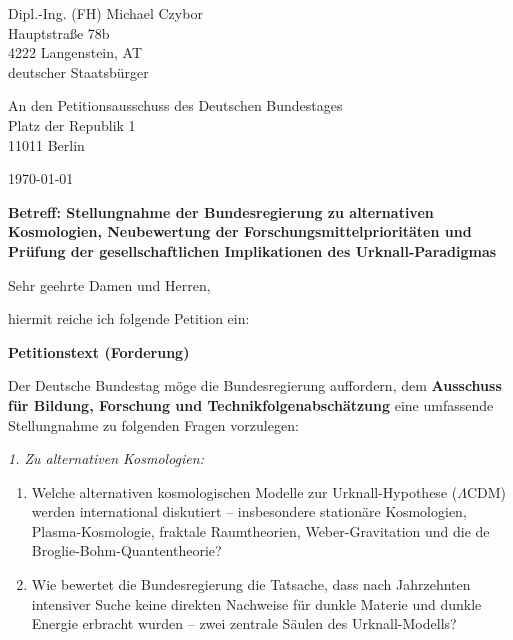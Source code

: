 \documentclass[11pt,a4paper]{letter}
\begin{document}
\begin{letter}

Dipl.-Ing. (FH) Michael Czybor \\ Hauptstraße 78b \\ 4222 Langenstein, AT \\ deutscher Staatsbürger

\vspace{0.5cm}

An den Petitionsausschuss des Deutschen Bundestages \\ Platz der Republik 1 \\ 11011 Berlin

\begin{flushright}
	\today
\end{flushright}

\vspace{0.5cm}

\textbf{Betreff: Stellungnahme der Bundesregierung zu alternativen Kosmologien, Neubewertung der Forschungsmittelprioritäten und Prüfung der gesellschaftlichen Implikationen des Urknall-Paradigmas}

\vspace{0.5cm}

Sehr geehrte Damen und Herren,

hiermit reiche ich folgende Petition ein:

\vspace{0.3cm}

\noindent
\textbf{Petitionstext (Forderung)}

Der Deutsche Bundestag möge die Bundesregierung auffordern, dem \textbf{Ausschuss für Bildung, Forschung und Technikfolgenabschätzung} eine umfassende Stellungnahme zu folgenden Fragen vorzulegen:

\vspace{0.2cm}

\noindent
\textit{1. Zu alternativen Kosmologien:}

\begin{enumerate}
    \item Welche alternativen kosmologischen Modelle zur Urknall-Hypothese ($\Lambda$CDM) werden international diskutiert – insbesondere stationäre Kosmologien, Plasma-Kosmologie, fraktale Raumtheorien, Weber-Gravitation und die de Broglie-Bohm-Quantentheorie?
    
    \item Wie bewertet die Bundesregierung die Tatsache, dass nach Jahrzehnten intensiver Suche keine direkten Nachweise für dunkle Materie und dunkle Energie erbracht wurden – zwei zentrale Säulen des Urknall-Modells?
    

\end{enumerate}
\end{letter}
\end{document}
